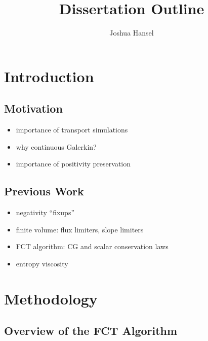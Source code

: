 \documentclass{report}
\title{Dissertation Outline}
\author{Joshua Hansel}
\begin{document}
\chapter{Introduction}
\section{Motivation}
\begin{itemize}
  \item importance of transport simulations
  \item why continuous Galerkin?
  \item importance of positivity preservation
\end{itemize}

\section{Previous Work}
\begin{itemize}
  \item negativity ``fixups''
  \item finite volume: flux limiters, slope limiters
  \item FCT algorithm: CG and scalar conservation laws
  \item entropy viscosity
\end{itemize}

\chapter{Methodology}
\section{Overview of the FCT Algorithm}
\end{document}
